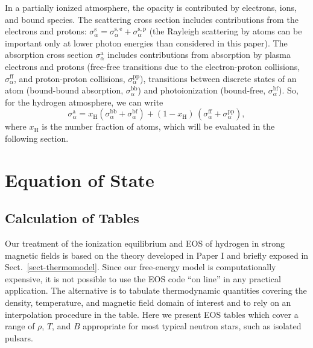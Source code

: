 \documentclass{emulateapj}
\newcommand{\beq}{\begin{equation}}
\newcommand{\eeq}{\end{equation}}
\newcommand{\bea}{\begin{eqnarray}}
\begin{document}
In a partially ionized atmosphere, the opacity is contributed
by electrons, ions, and bound species. 
The scattering cross section includes contributions from the
electrons and protons: 
$
   \sigma_\alpha^\mathrm{s} = \sigma_\alpha^\mathrm{s,e}
              + \sigma_\alpha^\mathrm{s,p}$
(the Rayleigh scattering by atoms can be important only at 
 lower photon energies than considered in this paper).
The absorption cross section $\sigma_\alpha^\mathrm{a}$
includes contributions from absorption by plasma electrons and protons
(free-free transitions due to the electron-proton collisions,
 $\sigma_\alpha^\mathrm{ff}$, and proton-proton collisions,
 $\sigma_\alpha^\mathrm{pp}$),
transitions between discrete states of an atom
(bound-bound absorption, $\sigma_\alpha^\mathrm{bb}$) and
photoionization (bound-free, $\sigma_\alpha^\mathrm{bf}$).
So, for the hydrogen atmosphere, 
we can write
\beq
   \sigma_\alpha^\mathrm{a} = 
   x_\mathrm{H} (\sigma_\alpha^\mathrm{bb}+\sigma_\alpha^\mathrm{bf})
   + (1-x_\mathrm{H})\,(\sigma_\alpha^\mathrm{ff}
   + \sigma_\alpha^\mathrm{pp}) ,
\label{kappa-mix}
\eeq
where $x_\mathrm{H}$ is the number fraction of atoms,
which will be evaluated in the
following section.

       \section{Equation of State}
\label{sect-EOS}
      \subsection{Calculation of Tables}
%
Our treatment of the ionization equilibrium and EOS 
of hydrogen in strong magnetic fields is based
on the theory developed in Paper I and briefly exposed
in Sect.\ \ref{sect-thermomodel}. 
Since our free-energy model is computationally expensive,
it is not possible to use the EOS code ``on line'' in any practical
application. The alternative is to tabulate 
thermodynamic quantities covering the density, temperature, and
magnetic field domain of interest and to rely on an interpolation procedure in the table.
Here we present EOS tables
which cover a range of $\rho$, $T$, and $B$
appropriate for most typical neutron stars, such as isolated
pulsars. 
\end{document}
